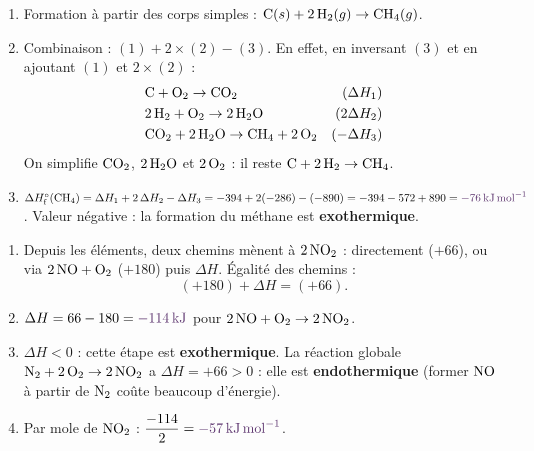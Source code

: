 \documentclass[11pt,a4paper]{article}
\newcommand{\dH}{\Delta H}
\newcommand{\dHf}{\Delta H^{\circ}_{\text{f}}}
\newcommand{\rep}[1]{\textcolor{primarydark}{\textbf{#1}}}
\begin{document}
\begin{center}
\end{center}

\begin{correction}
\begin{enumerate}[label=\alph*),leftmargin=2em,topsep=2pt,itemsep=3pt]
  \item Formation à partir des corps simples : \;$\ce{C}(s) + 2\,\ce{H2}(g) \rightarrow \ce{CH4}(g)$.
  \item Combinaison : $(1) + 2\times(2) - (3)$. En effet, en inversant $(3)$ et en ajoutant $(1)$ et
        $2\times(2)$ :
  \begin{align*}
    &\ce{C} + \ce{O2} \rightarrow \ce{CO2} & (\dH_1)\\
    &2\,\ce{H2} + \ce{O2} \rightarrow 2\,\ce{H2O} & (2\dH_2)\\
    &\ce{CO2} + 2\,\ce{H2O} \rightarrow \ce{CH4} + 2\,\ce{O2} & (-\dH_3)
  \end{align*}
  On simplifie $\ce{CO2}$, $2\,\ce{H2O}$ et $2\,\ce{O2}$ : il reste $\ce{C} + 2\,\ce{H2} \rightarrow \ce{CH4}$. \checkmark
  \item $\dHf(\ce{CH4}) = \dH_1 + 2\,\dH_2 - \dH_3 = -394 + 2(-286) - (-890) = -394 - 572 + 890 = \rep{\SI{-76}{\kilo\joule\per\mol}}$.
        Valeur négative : la formation du méthane est \rep{exothermique}.
\end{enumerate}
\end{correction}

\begin{correction}
\begin{enumerate}[label=\alph*),leftmargin=2em,topsep=2pt,itemsep=2pt]
  \item Depuis les éléments, deux chemins mènent à $2\,\ce{NO2}$ : directement ($+66$), ou via
        $2\,\ce{NO}+\ce{O2}$ ($+180$) puis $\dH$. Égalité des chemins :
        \[ (+180) + \dH = (+66). \]
  \item $\dH = 66 - 180 = \rep{\SI{-114}{\kilo\joule}}$ pour $2\,\ce{NO}+\ce{O2}\rightarrow 2\,\ce{NO2}$.
  \item $\dH<0$ : cette étape est \rep{exothermique}. La réaction globale
        $\ce{N2}+2\,\ce{O2}\rightarrow2\,\ce{NO2}$ a $\dH=+66>0$ : elle est \rep{endothermique}
        (former $\ce{NO}$ à partir de $\ce{N2}$ coûte beaucoup d'énergie).
  \item Par mole de $\ce{NO2}$ : $\dfrac{-114}{2} = \rep{\SI{-57}{\kilo\joule\per\mol}}$.
\end{enumerate}
\end{correction}
\end{document}
